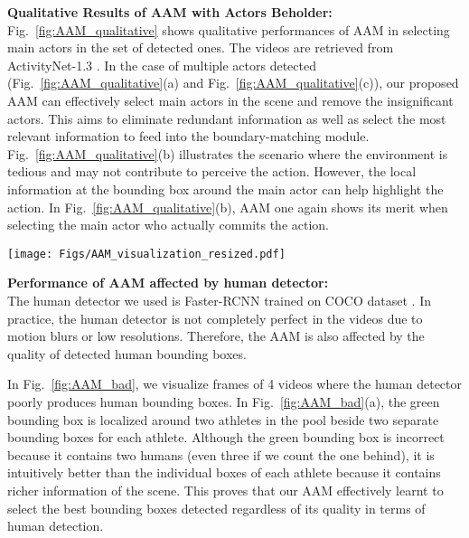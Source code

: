 \documentclass[sn-mathphys]{sn-jnl}
\theoremstyle{thmstyleone}\newtheorem{theorem}{Theorem}\newtheorem{proposition}[theorem]{Proposition}
\theoremstyle{thmstyletwo}\newtheorem{example}{Example}\newtheorem{remark}{Remark}
\theoremstyle{thmstylethree}\newtheorem{definition}{Definition}
\begin{document}
\noindent\textbf{Qualitative Results of AAM with Actors Beholder:}\\
Fig.~\ref{fig:AAM_qualitative} shows qualitative performances of AAM in selecting main actors in the set of detected ones. The videos are retrieved from ActivityNet-1.3 \cite{caba2015activitynet}. 
In the case of multiple actors detected (Fig.~\ref{fig:AAM_qualitative}(a) and Fig.~\ref{fig:AAM_qualitative}(c)), our proposed AAM can effectively select main actors in the scene and remove the insignificant actors. This aims to eliminate redundant information as well as select the most relevant information to feed into the boundary-matching module. Fig.~\ref{fig:AAM_qualitative}(b) illustrates the scenario where the environment is tedious and may not contribute to perceive the action. However, the local information at the bounding box around the main actor can help highlight the action. In Fig.~\ref{fig:AAM_qualitative}(b), AAM one again shows its merit when selecting the main actor who actually commits the action.

\begin{figure*}[!ht]
    \centering
    \texttt{[image: Figs/AAM\_visualization\_resized.pdf]}
    \caption{Visualization of main actors selection resulting by AAM on ActivityNet-1.3 \cite{caba2015activitynet}. (a), (b), and (c) are three different videos. The background is blacked out, the bounding boxes of main actors are outlined by green line and the bounding boxes of insignificant actors are outlined by grey line.}
    \label{fig:AAM_qualitative}
\end{figure*}

\vspace{2mm}
\noindent\textbf{Performance of AAM affected by human detector:}\\
The human detector we used is Faster-RCNN \cite{FasterRCNN} trained on COCO dataset \cite{cocodataset}. In practice, the human detector is not completely perfect in the videos due to motion blurs or low resolutions. Therefore, the AAM is also affected by the quality of detected human bounding boxes.

In Fig.~\ref{fig:AAM_bad}, we visualize frames of 4 videos where the human detector poorly produces human bounding boxes. In Fig.~\ref{fig:AAM_bad}(a), the green bounding box is localized around two athletes in the pool beside two separate bounding boxes for each athlete. Although the green bounding box is incorrect because it contains two humans (even three if we count the one behind), it is intuitively better than the individual boxes of each athlete because it contains richer information of the scene. This proves that our AAM effectively learnt to select the best bounding boxes detected regardless of its quality in terms of human detection.
\end{document}
